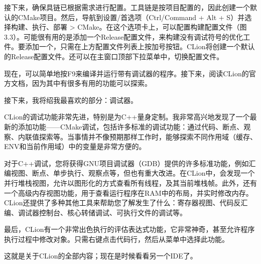 接下来，确保具链已根据需求进行配置。工具链是按项目配置的，因此创建一个默认的CMake项目。然后，导航到设置/首选项（Ctrl/Command + Alt + S）并选择构建、执行、部署 > CMake。在这个选项卡上，可以配置构建配置文件（图3.3）。可能很有用的是添加一个Release配置文件，来构建没有调试符号的优化工件。要添加一个，只需在上方配置文件列表上按加号按钮。CLion将创建一个默认的Release配置文件。还可以在主窗口顶部下拉菜单中，切换配置文件。

现在，可以简单地按F9来编译并运行带有调试器的程序。接下来，阅读CLion的官方文档，因为其中有很多有用的功能可以探索。

接下来，我将绍我最喜欢的部分：调试器。


CLion的调试功能非常先进，特别是为C++量身定制。我非常高兴地发现了一个最新的添加功能——CMake调试，包括许多标准的调试功能：通过代码、断点、观察、内联值探索等。当事情并不像预期那样工作时，能够探索不同作用域（缓存、ENV和当前作用域）中的变量是非常方便的。

对于C++调试，您将获得GNU项目调试器（GDB）提供的许多标准功能，例如汇编视图、断点、单步执行、观察点等，但也有重大改进。在CLion中，会发现一个并行堆栈视图，允许以图形化的方式查看所有线程，及其当前堆栈帧。此外，还有一个高级内存视图功能，用于查看运行程序在RAM中的布局，并实时修改内存。CLion还提供了多种其他工具来帮助您了解发生了什么：寄存器视图、代码反汇编、调试器控制台、核心转储调试、可执行文件的调试等。

最后，CLion有一个非常出色执行的评估表达式功能，它非常神奇，甚至允许程序执行过程中修改对象。只需右键点击代码行，然后从菜单中选择此功能。

这就是关于CLion的全部内容；现在是时候看看另一个IDE了。



























